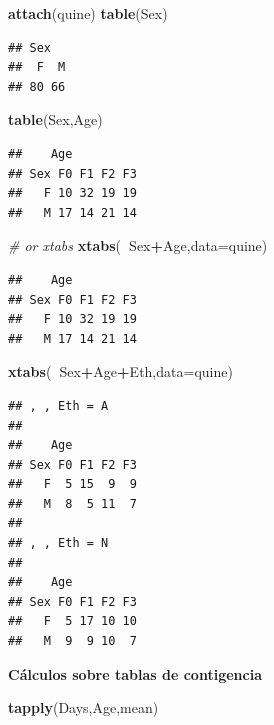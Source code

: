 \documentclass[]{book}
\newenvironment{Shaded}{\begin{snugshade}}{\end{snugshade}}
\newcommand{\KeywordTok}[1]{\textcolor[rgb]{0.13,0.29,0.53}{\textbf{#1}}}
\newcommand{\DataTypeTok}[1]{\textcolor[rgb]{0.13,0.29,0.53}{#1}}
\newcommand{\CommentTok}[1]{\textcolor[rgb]{0.56,0.35,0.01}{\textit{#1}}}
\newcommand{\OperatorTok}[1]{\textcolor[rgb]{0.81,0.36,0.00}{\textbf{#1}}}
\newcommand{\NormalTok}[1]{#1}
\begin{document}
\begin{Shaded}
\begin{Highlighting}[]
\KeywordTok{attach}\NormalTok{(quine)}
\KeywordTok{table}\NormalTok{(Sex)}
\end{Highlighting}
\end{Shaded}

\begin{verbatim}
## Sex
##  F  M 
## 80 66
\end{verbatim}

\begin{Shaded}
\begin{Highlighting}[]
\KeywordTok{table}\NormalTok{(Sex,Age)}
\end{Highlighting}
\end{Shaded}

\begin{verbatim}
##    Age
## Sex F0 F1 F2 F3
##   F 10 32 19 19
##   M 17 14 21 14
\end{verbatim}

\begin{Shaded}
\begin{Highlighting}[]
\CommentTok{# or xtabs}
\KeywordTok{xtabs}\NormalTok{(}\OperatorTok{~}\NormalTok{Sex}\OperatorTok{+}\NormalTok{Age,}\DataTypeTok{data=}\NormalTok{quine)}
\end{Highlighting}
\end{Shaded}

\begin{verbatim}
##    Age
## Sex F0 F1 F2 F3
##   F 10 32 19 19
##   M 17 14 21 14
\end{verbatim}

\begin{Shaded}
\begin{Highlighting}[]
\KeywordTok{xtabs}\NormalTok{(}\OperatorTok{~}\NormalTok{Sex}\OperatorTok{+}\NormalTok{Age}\OperatorTok{+}\NormalTok{Eth,}\DataTypeTok{data=}\NormalTok{quine)}
\end{Highlighting}
\end{Shaded}

\begin{verbatim}
## , , Eth = A
## 
##    Age
## Sex F0 F1 F2 F3
##   F  5 15  9  9
##   M  8  5 11  7
## 
## , , Eth = N
## 
##    Age
## Sex F0 F1 F2 F3
##   F  5 17 10 10
##   M  9  9 10  7
\end{verbatim}

\textbf{Cálculos sobre tablas de contigencia}

\begin{Shaded}
\begin{Highlighting}[]
\KeywordTok{tapply}\NormalTok{(Days,Age,mean)}
\end{Highlighting}
\end{Shaded}
\end{document}
